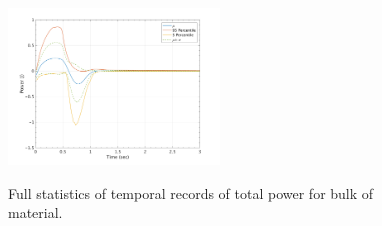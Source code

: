 \documentclass{article}
\begin{document}
\begin{figure}[H]
        \begin{minipage}[b]{1\linewidth}
                \centering
                \includegraphics[width=0.5\textwidth]{InclinedPlane/GlobalRecords/V_Global_Ptot.png}
                \label{fig:Ramp-SP-Power-V}
        \end{minipage}
        \caption{Full statistics of temporal records of total power for bulk of material.}
        \label{fig:Ramp-SP-Power}
\end{figure}
\end{document}
